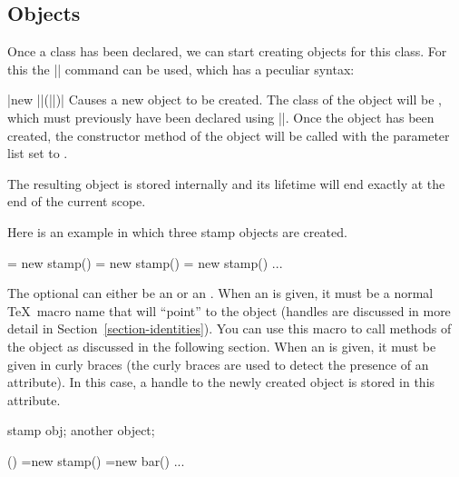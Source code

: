 \subsection{Objects}

Once a class has been declared, we can start creating objects for this class.
For this the |\pgfoonew| command can be used, which has a peculiar syntax:

\begin{command}{\pgfoonew{}|new ||(||)|}
    Causes a new object to be created. The class of the object will be
    , which must previously have been declared using
    |\pgfooclass|. Once the object has been created, the constructor method of
    the object will be called with the parameter list set to .

    The resulting object is stored internally and its lifetime will end exactly
    at the end of the current scope.

    Here is an example in which three stamp objects are created.
\begin{codeexample}
\pgfoonew \firststamp  = new stamp()
\pgfoonew \secondstamp = new stamp()
{
  \pgfoonew \thirdstamp = new stamp()
  ...
}
\end{codeexample}

    The optional  can either be an
     or an . When an 
    is given, it must be a normal \TeX\ macro name that will ``point'' to the
    object (handles are discussed in more detail in
    Section~\ref{section-identities}). You can use this macro to call methods
    of the object as discussed in the following section. When an
     is given, it must be given in curly braces (the curly
    braces are used to detect the presence of an attribute). In this case, a
    handle to the newly created object is stored in this attribute.
\begin{codeexample}
{
  \attribute stamp obj;
  \attribute another object;

  \method \foo() {
    =new stamp()
    =new bar()
  }
  ...
}
\end{codeexample}
\end{command}


